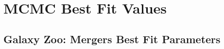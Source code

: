 \chapter{MCMC Best Fit Values}

\section{Galaxy Zoo: Mergers Best Fit Parameters}\label{Appendix_1}
